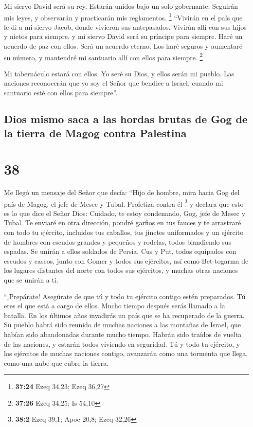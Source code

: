  Mi siervo David será su rey. Estarán unidos bajo un solo
gobernante. Seguirán mis leyes, y observarán y practicarán mis
reglamentos. \footnote{\textbf{37:24} Ezeq 34,23; Ezeq 36,27}
 ``Vivirán en el país que le di a mi siervo Jacob, donde
vivieron sus antepasados. Vivirán allí con sus hijos y nietos para
siempre, y mi siervo David será su príncipe para siempre.
 Haré un acuerdo de paz con ellos. Será un acuerdo
eterno. Los haré seguros y aumentaré su número, y mantendré mi santuario
allí con ellos para siempre. \footnote{\textbf{37:26} Ezeq 34,25; Is
  54,10}

 Mi tabernáculo estará con ellos. Yo seré su Dios, y
ellos serán mi pueblo.  Las naciones reconocerán que yo
soy el Señor que bendice a Israel, cuando mi santuario esté con ellos
para siempre''.

\hypertarget{dios-mismo-saca-a-las-hordas-brutas-de-gog-de-la-tierra-de-magog-contra-palestina}{%
\subsection{Dios mismo saca a las hordas brutas de Gog de la tierra de
Magog contra
Palestina}\label{dios-mismo-saca-a-las-hordas-brutas-de-gog-de-la-tierra-de-magog-contra-palestina}}

\hypertarget{section-37}{%
\section{38}\label{section-37}}

 Me llegó un mensaje del Señor que decía: 
``Hijo de hombre, mira hacia Gog del país de Magog, el jefe de Mesec y
Tubal. Profetiza contra él \footnote{\textbf{38:2} Ezeq 39,1; Apoc 20,8;
  Ezeq 32,26}  y declara que esto es lo que dice el Señor
Dios: Cuidado, te estoy condenando, Gog, jefe de Mesec y Tubal.
 Te enviaré en otra dirección, pondré garfios en tus
fauces y te arrastraré con todo tu ejército, incluidos tus caballos, tus
jinetes uniformados y un ejército de hombres con escudos grandes y
pequeños y rodelas, todos blandiendo sus espadas.  Se
unirán a ellos soldados de Persia, Cus y Put, todos equipados con
escudos y cascos,  junto con Gomer y todos sus ejércitos,
así como Bet-togarma de los lugares distantes del norte con todos sus
ejércitos, y muchas otras naciones que se unirán a ti.

 ``¡Prepárate! Asegúrate de que tú y todo tu ejército
contigo estén preparados. Tú eres el que está a cargo de ellos.
 Mucho tiempo después serás llamado a la batalla. En los
últimos años invadirás un país que se ha recuperado de la guerra. Su
pueblo habrá sido reunido de muchas naciones a las montañas de Israel,
que habían sido abandonadas durante mucho tiempo. Habrán sido traídos de
vuelta de las naciones, y estarán todos viviendo en seguridad.
 Tú y todo tu ejército, y los ejércitos de muchas naciones
contigo, avanzarán como una tormenta que llega, como una nube que cubre
la tierra.


